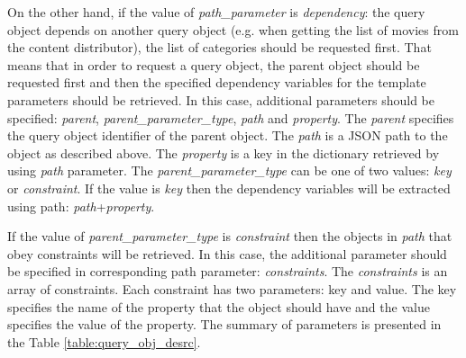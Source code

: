 On the other hand, if the value of \textit{path\_parameter} is \textit{dependency}: the query object depends on another query object (e.g. when getting the list of movies from the content distributor), the list of categories should be requested first. That means that in order to request a query object, the parent object should be requested first and then the specified dependency variables for the template parameters should be retrieved. In this case, additional parameters should be specified: \textit{parent}, \textit{parent\_parameter\_type}, \textit{path} and \textit{property}. The \textit{parent} specifies the query object identifier of the parent object. The \textit{path} is a JSON path to the object as described above. The \textit{property} is a key in the dictionary retrieved by using \textit{path} parameter. The \textit{parent\_parameter\_type} can be one of two values: \textit{key} or \textit{constraint}. If the value is \textit{key} then the dependency variables will be extracted using path: \textit{path}+\textit{property}.

If the value of \textit{parent\_parameter\_type} is \textit{constraint} then the objects in \textit{path} that obey constraints will be retrieved. In this case, the additional parameter should be specified in corresponding path parameter: \textit{constraints}. The \textit{constraints} is an array of constraints. Each constraint has two parameters: key and value. The key specifies the name of the property that the object should have and the value specifies the value of the property. The summary of parameters is presented in the Table \ref{table:query_obj_desrc}.


